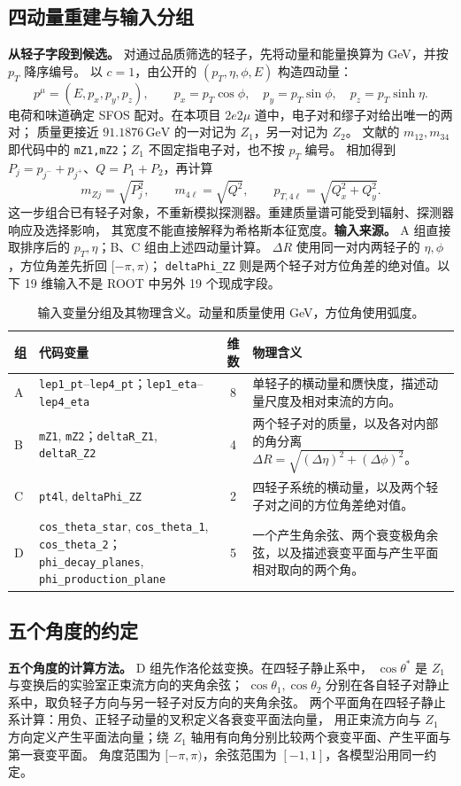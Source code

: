 \documentclass[11pt,a4paper,fontset=fandol,scheme=plain]{ctexart}
\newcommand{\gev}{\,\mathrm{GeV}}
\begin{document}
\subsection{四动量重建与输入分组}
\textbf{从轻子字段到候选。} 对通过品质筛选的轻子，先将动量和能量换算为 GeV，并按 $p_T$ 降序编号。
以 $c=1$，由公开的 $(p_T,\eta,\phi,E)$ 构造四动量：
\[
 p^\mu=(E,p_x,p_y,p_z),\qquad
 p_x=p_T\cos\phi,\quad p_y=p_T\sin\phi,\quad p_z=p_T\sinh\eta.
\]
电荷和味道确定 SFOS 配对。在本项目 $2e2\mu$ 道中，电子对和缪子对给出唯一的两对；
质量更接近 $91.1876\gev$ 的一对记为 $Z_1$，另一对记为 $Z_2$。
文献的 $m_{12},m_{34}$ 即代码中的 \texttt{mZ1,mZ2}；$Z_1$ 不固定指电子对，也不按 $p_T$ 编号。
相加得到 $P_j=p_{j^-}+p_{j^+}$、$Q=P_1+P_2$，再计算
\[
 m_{Zj}=\sqrt{P_j^2},\qquad m_{4\ell}=\sqrt{Q^2},\qquad
 p_{T,4\ell}=\sqrt{Q_x^2+Q_y^2}.
\]
这一步组合已有轻子对象，不重新模拟探测器。重建质量谱可能受到辐射、探测器响应及选择影响，
其宽度不能直接解释为希格斯本征宽度。\textbf{输入来源。} A 组直接取排序后的 $p_T,\eta$；B、C 组由上述四动量计算。
$\Delta R$ 使用同一对内两轻子的 $\eta,\phi$，方位角差先折回 $[-\pi,\pi)$；
\texttt{deltaPhi\_ZZ} 则是两个轻子对方位角差的绝对值。以下 19 维输入不是 ROOT 中另外 19 个现成字段。\begin{table}[H]
\caption{输入变量分组及其物理含义。动量和质量使用 GeV，方位角使用弧度。}
\label{tab:features}
\small
\renewcommand{\arraystretch}{1.12}
\begin{tabularx}{\linewidth}{@{}p{.05\linewidth}p{.43\linewidth}cY@{}}
\toprule
组 & 代码变量 & 维数 & 物理含义 \\
\midrule
A & \texttt{lep1\_pt}--\texttt{lep4\_pt}；\texttt{lep1\_eta}--\texttt{lep4\_eta} & 8 &
单轻子的横动量和赝快度，描述动量尺度及相对束流的方向。 \\
B & \texttt{mZ1}, \texttt{mZ2}；\texttt{deltaR\_Z1}, \texttt{deltaR\_Z2} & 4 &
两个轻子对的质量，以及各对内部的角分离 $\Delta R=\sqrt{(\Delta\eta)^2+(\Delta\phi)^2}$。 \\
C & \texttt{pt4l}, \texttt{deltaPhi\_ZZ} & 2 &
四轻子系统的横动量，以及两个轻子对之间的方位角差绝对值。 \\
D & \texttt{cos\_theta\_star}, \texttt{cos\_theta\_1}, \texttt{cos\_theta\_2}；
\texttt{phi\_decay\_planes}, \texttt{phi\_production\_plane} & 5 &
一个产生角余弦、两个衰变极角余弦，以及描述衰变平面与产生平面相对取向的两个角。 \\
\bottomrule
\end{tabularx}
\end{table}
\subsection{五个角度的约定}
\textbf{五个角度的计算方法。} D 组先作洛伦兹变换。在四轻子静止系中，
$\cos\theta^*$ 是 $Z_1$ 与变换后的实验室正束流方向的夹角余弦；
$\cos\theta_1,\cos\theta_2$ 分别在各自轻子对静止系中，取负轻子方向与另一轻子对反方向的夹角余弦。
两个平面角在四轻子静止系计算：用负、正轻子动量的叉积定义各衰变平面法向量，
用正束流方向与 $Z_1$ 方向定义产生平面法向量；绕 $Z_1$ 轴用有向角分别比较两个衰变平面、产生平面与第一衰变平面。
角度范围为 $[-\pi,\pi)$，余弦范围为 $[-1,1]$，各模型沿用同一约定。
\FloatBarrier
\end{document}
